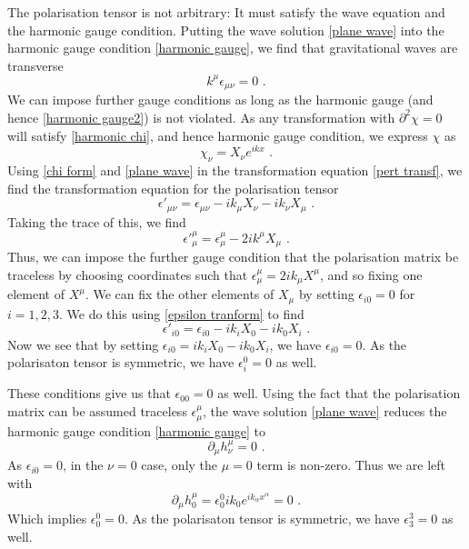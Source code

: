 \documentclass[11pt]{cuthesis}
\newcommand{\mn}{_{\mu\nu}}
\newcommand{\fs}{\text{ .}}
\begin{document}
The polarisation tensor is not arbitrary: It must satisfy the wave equation and the harmonic gauge condition. Putting the wave solution \ref{plane wave} into the harmonic gauge condition \ref{harmonic gauge}, we find that gravitational waves are transverse
\begin{equation} \label{harmonic gauge2}
k^\mu \epsilon\mn = 0 \fs
\end{equation}
We can impose further gauge conditions as long as the harmonic gauge (and hence \ref{harmonic gauge2}) is not violated. As any transformation with $\partial^2 \chi = 0$ will satisfy \ref{harmonic chi}, and hence harmonic gauge condition, we express $\chi$ as 
\begin{equation} \label{chi form}
\chi_\nu = X_\nu e^{ikx} \fs
\end{equation}
Using \ref{chi form} and \ref{plane wave} in the transformation equation \ref{pert transf}, we find the transformation equation for the polarisation tensor
\begin{equation} \label{epsilon tranform}
\epsilon'\mn = \epsilon\mn -ik_\mu X_\nu - ik_\nu X_\mu \fs
\end{equation}
Taking the trace of this, we find
\begin{equation}
\epsilon'^\mu_\mu = \epsilon^\mu_\mu - 2ik^\mu X_\mu \fs
\end{equation}
Thus, we can impose the further gauge condition that the polarisation matrix be traceless by choosing coordinates such that $\epsilon^\mu_\mu = 2ik_\mu X^\mu$, and so fixing one element of $X^\mu$. We can fix the other elements of $X_\mu$ by setting $\epsilon_{i 0} = 0$ for $i=1,2,3$. We do this using \ref{epsilon tranform} to find
\begin{equation} \label{epsilon 0}
\epsilon'_{i 0} = \epsilon_{i 0} -ik_i X_0 - ik_0 X_i \fs
\end{equation}
Now we see that by setting $ \epsilon_{i 0} = ik_i X_0 - ik_0 X_i$, we have $\epsilon_{i 0} = 0$. As the polarisaton tensor is symmetric, we have $\epsilon^0_i=0$ as well.

These conditions give us that $\epsilon_{0 0} = 0$ as well. Using the fact that the polarisation matrix can be assumed traceless $\epsilon^\mu_\mu$, the wave solution \ref{plane wave} reduces the harmonic gauge condition \ref{harmonic gauge} to 
\begin{equation}
\partial_\mu h^\mu_\nu = 0 \fs
\end{equation}
As $\epsilon_{i 0} = 0$, in the $\nu = 0$ case, only the $\mu=0$ term is non-zero. Thus we are left with
\begin{equation}
\partial_\mu h^\mu_0 = \epsilon^0_0 i k_0 e^{ik_\alpha x^\alpha} = 0 \fs
\end{equation}
Which implies $\epsilon^0_0=0$. As the polarisaton tensor is symmetric, we have $\epsilon^3_3=0$ as well.  
\end{document}
